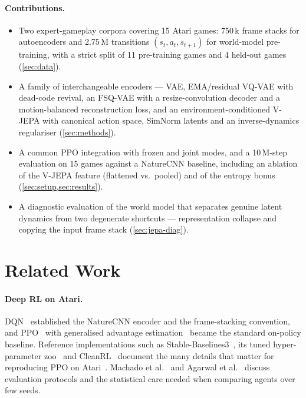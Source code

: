 \documentclass[runningheads]{llncs}
\begin{document}
\paragraph{Contributions.}
\begin{itemize}
  \item Two expert-gameplay corpora covering 15 Atari games: 750\,k frame stacks for
  autoencoders and 2.75\,M transitions $(s_t,a_t,s_{t+1})$ for world-model
  pre-training, with a strict split of 11 pre-training games and 4 held-out games
  (\cref{sec:data}).
  \item A family of interchangeable encoders --- VAE, EMA/residual VQ-VAE with dead-code
  revival, an FSQ-VAE with a resize-convolution decoder and a motion-balanced
  reconstruction loss, and an environment-conditioned V-JEPA with canonical action
  space, SimNorm latents and an inverse-dynamics regulariser (\cref{sec:methods}).
  \item A common PPO integration with frozen and joint modes, and a 10\,M-step
  evaluation on 15 games against a NatureCNN baseline, including an ablation of the
  V-JEPA feature (flattened vs.\ pooled) and of the entropy bonus
  (\cref{sec:setup,sec:results}).
  \item A diagnostic evaluation of the world model that separates genuine latent
  dynamics from two degenerate shortcuts --- representation collapse and copying the
  input frame stack (\cref{sec:jepa-diag}).
\end{itemize}

\section{Related Work}
\label{sec:related}

\paragraph{Deep RL on Atari.}
DQN~\cite{mnih2015human} established the NatureCNN encoder and the frame-stacking
convention, and PPO~\cite{schulman2017ppo} with generalised advantage
estimation~\cite{schulman2016gae} became the standard on-policy baseline. Reference
implementations such as Stable-Baselines3~\cite{raffin2021sb3}, its tuned
hyper-parameter zoo~\cite{raffin2020zoo} and CleanRL~\cite{huang2022cleanrl} document
the many details that matter for reproducing PPO on
Atari~\cite{huang2022implementation}. Machado et al.~\cite{machado2018revisiting} and
Agarwal et al.~\cite{agarwal2021precipice} discuss evaluation protocols and the
statistical care needed when comparing agents over few seeds.
\end{document}
